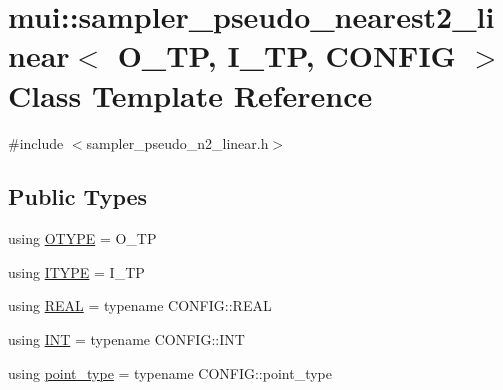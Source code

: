 \hypertarget{classmui_1_1sampler__pseudo__nearest2__linear}{}\section{mui\+:\+:sampler\+\_\+pseudo\+\_\+nearest2\+\_\+linear$<$ O\+\_\+\+TP, I\+\_\+\+TP, C\+O\+N\+F\+IG $>$ Class Template Reference}
\label{classmui_1_1sampler__pseudo__nearest2__linear}


{\ttfamily \#include $<$sampler\+\_\+pseudo\+\_\+n2\+\_\+linear.\+h$>$}

\subsection*{Public Types}
\begin{DoxyCompactItemize}
\item 
using \hyperlink{classmui_1_1sampler__pseudo__nearest2__linear_a3c1ae43f20045121e8c84d1f7116cf67}{O\+T\+Y\+PE} = O\+\_\+\+TP
\item 
using \hyperlink{classmui_1_1sampler__pseudo__nearest2__linear_a1ab1a956844436db5763df87746f4090}{I\+T\+Y\+PE} = I\+\_\+\+TP
\item 
using \hyperlink{classmui_1_1sampler__pseudo__nearest2__linear_aa35e86c6cf0ff62396daf5a94b6d931e}{R\+E\+AL} = typename C\+O\+N\+F\+I\+G\+::\+R\+E\+AL
\item 
using \hyperlink{classmui_1_1sampler__pseudo__nearest2__linear_a0c56f2dcb173523bfdb33fc9a271c767}{I\+NT} = typename C\+O\+N\+F\+I\+G\+::\+I\+NT
\item 
using \hyperlink{classmui_1_1sampler__pseudo__nearest2__linear_ab60b56e487c5be134d5efcbf03f7621f}{point\+\_\+type} = typename C\+O\+N\+F\+I\+G\+::point\+\_\+type
\end{DoxyCompactItemize}
